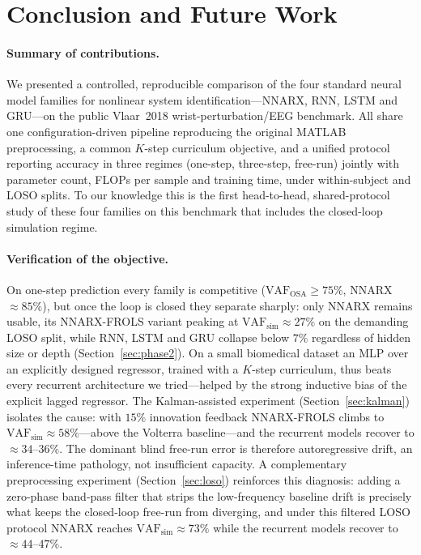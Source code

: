\documentclass[10pt,twocolumn,letterpaper]{article}
\begin{document}
\section{Conclusion and Future Work}\label{sec:conclusion}

\paragraph{Summary of contributions.}
We presented a controlled, reproducible comparison of the four standard
neural model families for nonlinear system identification---NNARX, RNN,
LSTM and GRU---on the public Vlaar~2018 wrist-perturbation/EEG benchmark.
All share one configuration-driven pipeline reproducing the original
MATLAB preprocessing, a common $K$-step curriculum objective, and a unified
protocol reporting accuracy in three regimes (one-step, three-step,
free-run) jointly with parameter count, FLOPs per sample and training time,
under within-subject and LOSO splits. To our knowledge this is the first
head-to-head, shared-protocol study of these four families on this
benchmark that includes the closed-loop simulation regime.

\paragraph{Verification of the objective.}
On one-step prediction every family is competitive
($\mathrm{VAF_{OSA}}\geq 75\%$, NNARX $\approx 85\%$), but once the loop is
closed they separate sharply: only NNARX remains usable, its NNARX-FROLS
variant peaking at $\mathrm{VAF_{sim}}\approx 27\%$ on the demanding LOSO
split, while RNN, LSTM and GRU collapse below $7\%$ regardless of hidden
size or depth (Section~\ref{sec:phase2}). On a small biomedical dataset an
MLP over an explicitly designed regressor, trained with a $K$-step
curriculum, thus beats every recurrent architecture we tried---helped by
the strong inductive bias of the explicit lagged regressor. The
Kalman-assisted experiment (Section~\ref{sec:kalman}) isolates the cause:
with $15\%$ innovation feedback NNARX-FROLS climbs to
$\mathrm{VAF_{sim}}\approx 58\%$---above the Volterra baseline---and the
recurrent models recover to $\approx 34$--$36\%$. The dominant blind
free-run error is therefore autoregressive drift, an inference-time
pathology, not insufficient capacity. A complementary preprocessing
experiment (Section~\ref{sec:loso}) reinforces this diagnosis: adding a
zero-phase band-pass filter that strips the low-frequency baseline drift is
precisely what keeps the closed-loop free-run from diverging, and under
this filtered LOSO protocol NNARX reaches $\mathrm{VAF_{sim}}\approx 73\%$
while the recurrent models recover to $\approx 44$--$47\%$.
\end{document}
